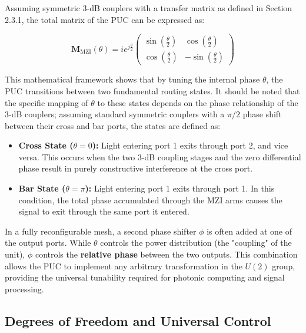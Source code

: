 Assuming symmetric $3$-dB couplers with a transfer matrix as defined in Section 2.3.1, the total 
matrix of the PUC can be expressed as:

\begin{equation}
\mathbf{M}_{\text{MZI}}(\theta) = i e^{j\frac{\theta}{2}} 
\begin{pmatrix} 
\sin\left(\frac{\theta}{2}\right) & \cos\left(\frac{\theta}{2}\right) \\[10pt] 
\cos\left(\frac{\theta}{2}\right) & -\sin\left(\frac{\theta}{2}\right) 
\end{pmatrix}
\label{eq:mzi_matrix_final}
\end{equation}

This mathematical framework shows that by tuning the internal phase $\theta$, the PUC transitions 
between two fundamental routing states. It should be noted that the specific mapping of $\theta$ to 
these states depends on the phase relationship of the $3$-dB couplers; assuming standard symmetric 
couplers with a $\pi/2$ phase shift between their cross and bar ports, the states are defined as:
\begin{itemize}
    \item \textbf{Cross State ($\theta = 0$):} Light entering port 1 exits through port 2, and vice 
    versa. This occurs when the two $3$-dB coupling stages and the zero differential phase result 
    in purely constructive interference at the cross port.
    \item \textbf{Bar State ($\theta = \pi$):} Light entering port 1 exits through port 1. In this 
    condition, the total phase accumulated through the MZI arms causes the signal to exit through 
    the same port it entered.
\end{itemize}



In a fully reconfigurable mesh, a second phase shifter $\phi$ is often added at one of the output 
ports. While $\theta$ controls the power distribution (the "coupling" of the unit), $\phi$ controls 
the \textbf{relative phase} between the two outputs. This combination allows the PUC to implement 
any arbitrary transformation in the $U(2)$ group, providing the universal tunability required for 
photonic computing and signal processing.


\subsection{Degrees of Freedom and Universal Control}

